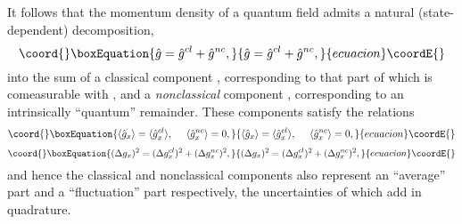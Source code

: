 \documentclass[a4paper,preprint, showpacs, aps, draft]{revtex4}
\begin{document}
{It follows that the momentum density of a quantum field admits a natural
(state-dependent) decomposition,
\begin{equation}\coord{}\boxEquation{
\label{gdecomp} \hat{g} = \hat{g}^{cl} + \hat{g}^{nc} ,
}{
\hat{g} = \hat{g}^{cl} + \hat{g}^{nc} ,
}{ecuacion}\coordE{}\end{equation}
into the sum of a classical component \coordHE{},
corresponding to
that part of \coordHE{} which is comeasurable with \coordHE{}, and a {\it
nonclassical} component \coordHE{}, corresponding to an 
intrinsically ``quantum'' remainder. These
components satisfy the relations
\begin{equation}\coord{}\boxEquation{ \label{gav}
\langle \hat{g}_x\rangle = \langle\hat{g}^{cl}_x\rangle,
~~~~\langle\hat{g}^{nc}_x\rangle = 0,
}{ \langle \hat{g}_x\rangle = \langle\hat{g}^{cl}_x\rangle,
~~~~\langle\hat{g}^{nc}_x\rangle = 0,
}{ecuacion}\coordE{}\end{equation} 
\begin{equation}\coord{}\boxEquation{ \label{gvar}
(\Delta g_x)^2 = (\Delta g^{cl}_x)^2 + (\Delta g^{nc}_x)^2 , 
}{ (\Delta g_x)^2 = (\Delta g^{cl}_x)^2 + (\Delta g^{nc}_x)^2 , 
}{ecuacion}\coordE{}\end{equation}
and hence the classical and nonclassical components also represent an
``average'' part and a ``fluctuation'' part respectively, the 
uncertainties of which add in quadrature. 

}
\end{document}
